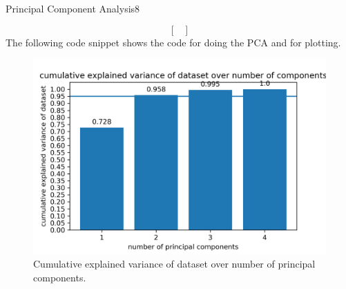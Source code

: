 \begin{questions}
\begin{question}{Principal Component Analysis}{8}
\begin{answer}
$$\begin{bmatrix}
\end{bmatrix}$$
The following code snippet shows the code for doing the PCA and for plotting.\\

\end{answer}
\begin{figure}[h!]
	\includegraphics[width=0.8\linewidth]{pictures/explained_var_cumulative.png}
	\centering
	\caption{Cumulative explained variance of dataset over number of principal components.}
	\label{fig:1}
\end{figure}
\end{question}



\end{questions}

